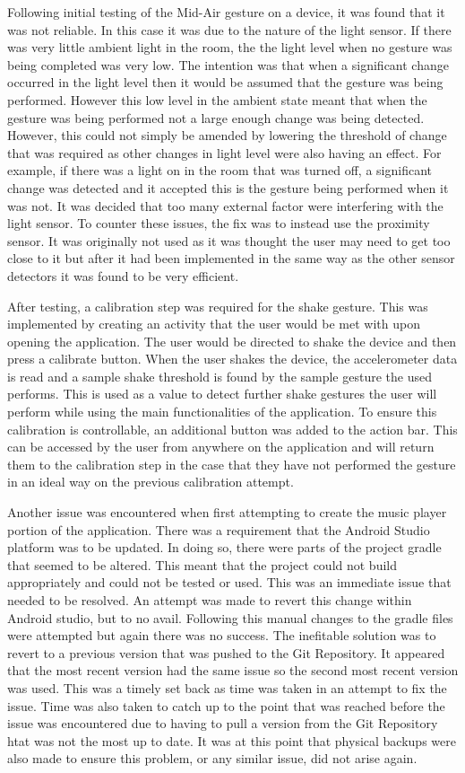 \documentclass{l4proj}
\begin{document}
Following initial testing of the Mid-Air gesture on a device, it was found that it was not reliable. In this case it was due to the nature of the light sensor. If there was very little ambient light in the room, the the light level when no gesture was being completed was very low. The intention was that when a significant change occurred in the light level then it would be assumed that the gesture was being performed. However this low level in the ambient state meant that when the gesture was being performed not a large enough change was being detected. However, this could not simply be amended by lowering the threshold of change that was required as other changes in light level were also having an effect. For example, if there was a light on in the room that was turned off, a significant change was detected and it accepted this is the gesture being performed when it was not. It was decided that too many external factor were interfering with the light sensor. To counter these issues, the fix was to instead use the proximity sensor. It was originally not used as it was thought the user may need to get too close to it but after it had been implemented in the same way as the other sensor detectors it was found to be very efficient.

After testing, a calibration step was required for the shake gesture. This was implemented by creating an activity that the user would be met with upon opening the application. The user would be directed to shake the device and then press a calibrate button. When the user shakes the device, the accelerometer data is read and a sample shake threshold is found by the sample gesture the used performs. This is used as a value to detect further shake gestures the user will perform while using the main functionalities of the application. To ensure this calibration is controllable, an additional button was added to the action bar. This can be accessed by the user from anywhere on the application and will return them to the calibration step in the case that they have not performed the gesture in an ideal way on the previous calibration attempt.

Another issue was encountered when first attempting to create the music player portion of the application. There was a requirement that the Android Studio platform was to be updated. In doing so, there were parts of the project gradle that seemed to be altered. This meant that the project could not build appropriately and could not be tested or used. This was an immediate issue that needed to be resolved. An attempt was made to revert this change within Android studio, but to no avail. Following this manual changes to the gradle files were attempted but again there was no success. The inefitable solution was to revert to a previous version that was pushed to the Git Repository. It appeared that the most recent version had the same issue so the second most recent version was used. This was a timely set back as time was taken in an attempt to fix the issue. Time was also taken to catch up to the point that was reached before the issue was encountered due to having to pull a version from the Git Repository htat was not the most up to date. It was at this point that physical backups were also made to ensure this problem, or any similar issue, did not arise again.
\end{document}
